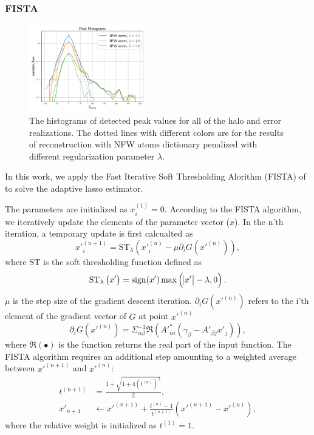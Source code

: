 \documentclass[twocolumn]{aastex62}
\begin{document}
\subsubsection{FISTA}

\begin{figure}[!t]
 \centering
 \includegraphics[width=0.45\textwidth]{peak_histograms.pdf}
 \caption{The histograms of detected peak values for all of the halo and error realizations. The dotted lines with different 
 colors are for the results of reconstruction with NFW atoms dictionary penalized with different regularization parameter 
 $\lambda$.}
\end{figure}

In this work, we apply the Fast Iterative Soft Thresholding Alorithm (FISTA) of \citet{FISTA-Beck2009} to solve 
the adaptive lasso estimator.

The parameters are initialized as $x_i^{(1)}=0$. According to the FISTA algorithm, we iteratively 
update the elements of the parameter vector ($x$). In the n'th iteration, a temporary update is first calcualted as
\begin{equation}
x'^{(n+1)}_{i}=\mathrm{ST}_{\lambda} \left(x'^{(n)}_{i} -\mu \partial_i G(x'^{(n)})\right),
\end{equation}
where $\mathrm{ST}$ is the soft thresholding function defined as
\begin{equation}
\mathrm{ST}_{\lambda} \left(x'\right) = \mathrm{sign} (x') \max \left(\abs{x'}-\lambda,0\right).
\end{equation}
$\mu$ is the step size of the gradient descent iteration. 
$\partial_i G(x'^{(n)})$ refers to the i'th element of the gradient
vector of $G$ at point $x'^{(n)}$
\begin{equation}
\partial_i G(x'^{(n)})=\Sigma^{-1}_{\alpha\beta}\Re\left(A'^{*}_{\alpha i}(\gamma_{\beta}-A'_{\beta j}x'_{j})\right),
\end{equation}
where $\Re\left( \bullet \right)$ is the function returns the real part of the input function.
The FISTA algorithm requires an additional step amounting to a weighted average between
$x'^{(n+1)}$ and $x'^{(n)}$:
\begin{equation}
\begin{split}
t^{(n+1)}&=\frac{1+\sqrt{1+4(t^{(n)})^2}}{2},\\
x'_{n+1} &\leftarrow x'^{(x+1)}+ \frac{t^{(n)}-1}{t^{(n+1)}}(x'^{(n+1)}-x'^{(n)}),
\end{split}
\end{equation}
where the relative weight is initialized as $t^{(1)}=1$.
\end{document}
